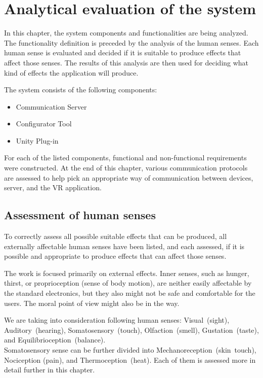 \chapter{Analytical evaluation of the system}\label{analysis}

In this chapter, the system components and functionalities are being analyzed.
The functionality definition is preceded by the analysis of the human senses.
Each human sense is evaluated and decided if it is suitable to produce effects
that affect those senses. The results of this analysis are then used for
deciding what kind of effects the application will produce.


The system consists of the following components:


\begin{itemize}
  \itemsep0em
  \item Communication Server
  \item Configurator Tool
  \item Unity Plug-in
\end{itemize}


For each of the listed components, functional and non-functional requirements
were constructed. At the end of this chapter, various communication protocols
are assessed to help pick an appropriate way of communication between devices,
server, and the VR application.


\hypertarget{x-assessment-of-human-senses}{\section{Assessment of human senses}}
To correctly assess all possible suitable effects that can be produced, all 
externally affectable human senses have been listed, and each assessed,
if it is possible and appropriate to produce effects that can affect those senses.


The work is focused primarily on external effects. Inner senses, such as
hunger, thirst, or proprioception (sense of body motion), are neither
easily affectable by the standard electronics, but they also might not be safe
and comfortable for the users. The moral point of view
might also be in the way.

We are taking into consideration following human senses:
Visual~(sight), Auditory~(hearing), Somatosensory~(touch), Olfaction~(smell),
Gustation~(taste), and Equilibrioception~(balance). \\
Somatosensory sense can
be further divided into Mechanoreception~(skin~touch), Nociception (pain), and
Thermoception~(heat). Each of them is assessed more in detail further in this
chapter.


